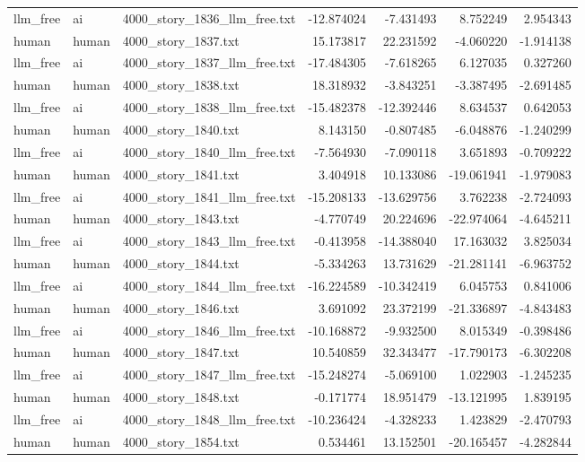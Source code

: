 \begin{longtable}{lllrrrr}
llm\_free & ai & 4000\_story\_1836\_llm\_free.txt & -12.874024 & -7.431493 & 8.752249 & 2.954343 \\
human & human & 4000\_story\_1837.txt & 15.173817 & 22.231592 & -4.060220 & -1.914138 \\
llm\_free & ai & 4000\_story\_1837\_llm\_free.txt & -17.484305 & -7.618265 & 6.127035 & 0.327260 \\
human & human & 4000\_story\_1838.txt & 18.318932 & -3.843251 & -3.387495 & -2.691485 \\
llm\_free & ai & 4000\_story\_1838\_llm\_free.txt & -15.482378 & -12.392446 & 8.634537 & 0.642053 \\
human & human & 4000\_story\_1840.txt & 8.143150 & -0.807485 & -6.048876 & -1.240299 \\
llm\_free & ai & 4000\_story\_1840\_llm\_free.txt & -7.564930 & -7.090118 & 3.651893 & -0.709222 \\
human & human & 4000\_story\_1841.txt & 3.404918 & 10.133086 & -19.061941 & -1.979083 \\
llm\_free & ai & 4000\_story\_1841\_llm\_free.txt & -15.208133 & -13.629756 & 3.762238 & -2.724093 \\
human & human & 4000\_story\_1843.txt & -4.770749 & 20.224696 & -22.974064 & -4.645211 \\
llm\_free & ai & 4000\_story\_1843\_llm\_free.txt & -0.413958 & -14.388040 & 17.163032 & 3.825034 \\
human & human & 4000\_story\_1844.txt & -5.334263 & 13.731629 & -21.281141 & -6.963752 \\
llm\_free & ai & 4000\_story\_1844\_llm\_free.txt & -16.224589 & -10.342419 & 6.045753 & 0.841006 \\
human & human & 4000\_story\_1846.txt & 3.691092 & 23.372199 & -21.336897 & -4.843483 \\
llm\_free & ai & 4000\_story\_1846\_llm\_free.txt & -10.168872 & -9.932500 & 8.015349 & -0.398486 \\
human & human & 4000\_story\_1847.txt & 10.540859 & 32.343477 & -17.790173 & -6.302208 \\
llm\_free & ai & 4000\_story\_1847\_llm\_free.txt & -15.248274 & -5.069100 & 1.022903 & -1.245235 \\
human & human & 4000\_story\_1848.txt & -0.171774 & 18.951479 & -13.121995 & 1.839195 \\
llm\_free & ai & 4000\_story\_1848\_llm\_free.txt & -10.236424 & -4.328233 & 1.423829 & -2.470793 \\
human & human & 4000\_story\_1854.txt & 0.534461 & 13.152501 & -20.165457 & -4.282844 \\

\end{longtable}
